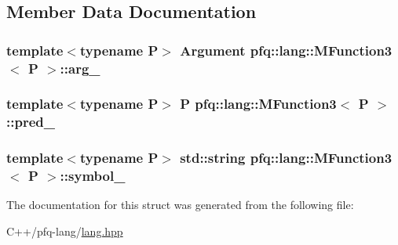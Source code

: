 \subsection{Member Data Documentation}
\hypertarget{structpfq_1_1lang_1_1MFunction3_ae20e5466578e1d49d86b1e38e75ce0bc}{
\subsubsection[{arg\+\_\+}]{\setlength{\rightskip}{0pt plus 5cm}template$<$typename P$>$ {\bf Argument} {\bf pfq\+::lang\+::\+M\+Function3}$<$ P $>$\+::arg\+\_\+}}\label{structpfq_1_1lang_1_1MFunction3_ae20e5466578e1d49d86b1e38e75ce0bc}
\hypertarget{structpfq_1_1lang_1_1MFunction3_a54985d2d3ed12bd63f03aaf6d495a004}{
\subsubsection[{pred\+\_\+}]{\setlength{\rightskip}{0pt plus 5cm}template$<$typename P$>$ P {\bf pfq\+::lang\+::\+M\+Function3}$<$ P $>$\+::pred\+\_\+}}\label{structpfq_1_1lang_1_1MFunction3_a54985d2d3ed12bd63f03aaf6d495a004}
\hypertarget{structpfq_1_1lang_1_1MFunction3_ac62b5953f995ac41fe11b68799317139}{
\subsubsection[{symbol\+\_\+}]{\setlength{\rightskip}{0pt plus 5cm}template$<$typename P$>$ std\+::string {\bf pfq\+::lang\+::\+M\+Function3}$<$ P $>$\+::symbol\+\_\+}}\label{structpfq_1_1lang_1_1MFunction3_ac62b5953f995ac41fe11b68799317139}


The documentation for this struct was generated from the following file\+:\begin{DoxyCompactItemize}
\item 
C++/pfq-\/lang/\hyperlink{lang_8hpp}{lang.\+hpp}\end{DoxyCompactItemize}
